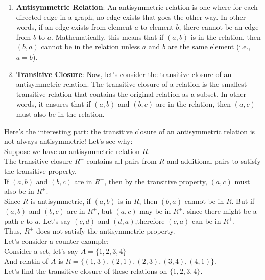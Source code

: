 \documentclass[12pt]{article}
\begin{document}
\begin{enumerate}
    \item \textbf{Antisymmetric Relation}:
An antisymmetric relation is one where for each directed edge in a graph, no edge exists that goes the other way. In other words, if an edge exists from element \( a \) to element \( b \), there cannot be an edge from \( b \) to \( a \). Mathematically, this means that if \( (a, b) \) is in the relation, then \( (b, a) \) cannot be in the relation unless \( a \) and \( b \) are the same element (i.e., \( a = b \)).
    \item \textbf{Transitive Closure}:
Now, let's consider the transitive closure of an antisymmetric relation. The transitive closure of a relation is the smallest transitive relation that contains the original relation as a subset. In other words, it ensures that if \( (a, b) \) and \( (b, c) \) are in the relation, then \( (a, c) \) must also be in the relation.
\end{enumerate}
Here's the interesting part: the transitive closure of an antisymmetric relation is not always antisymmetric! Let's see why:\\

Suppose we have an antisymmetric relation \( R \). \\
The transitive closure \( R^+ \) contains all pairs from \( R \) and additional pairs to satisfy the transitive property.\\
If \( (a, b) \) and \( (b, c) \) are in \( R^+ \), then by the transitive property, \( (a, c) \) must also be in \( R^+ \).\\
Since \( R \) is antisymmetric, if \( (a, b) \) is in \( R \), then \( (b, a) \) cannot be in \( R \). But if \( (a, b) \) and \( (b, c) \) are in \( R^+ \), but \( (a, c) \) may be in \( R^+ \), since there might be a path \(c\) to \(a\). Let's say \((c,d)\) and \( (d,a)\),therefore \( (c, a) \) can be in \( R^+ \). \\
Thus, \( R^+ \) does not satisfy the antisymmetric property. \\

Let's consider a counter example: \\

Consider a set, let's say \(A= \{1, 2, 3, 4\} \) \\

And relatin of \(A\) is \( R = \{(1, 3),(2, 1),(2, 3),(3, 4),(4, 1)\}\). \\


Let's find the transitive closure of these relations on \( \{1, 2, 3, 4\} \).
\end{document}
